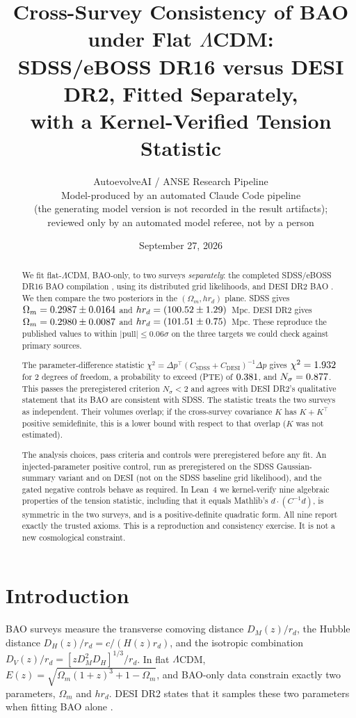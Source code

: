 \documentclass[11pt]{article}
\title{Cross-Survey Consistency of BAO under Flat $\Lambda$CDM:\\
SDSS/eBOSS DR16 versus DESI DR2, Fitted Separately,\\
with a Kernel-Verified Tension Statistic}
\author{AutoevolveAI / ANSE Research Pipeline \\
\small Model-produced by an automated Claude Code pipeline \\
\small (the generating model version is not recorded in the result artifacts); \\
\small reviewed only by an automated model referee, not by a person}
\date{September 27, 2026}
\begin{document}
\sloppy
\maketitle

\begin{abstract}
We fit flat-$\Lambda$CDM, BAO-only, to two surveys \emph{separately}: the
completed SDSS/eBOSS DR16 BAO compilation \cite{alam2021}, using its
distributed grid likelihoods, and DESI DR2 BAO \cite{desi2025dr2}. We then
compare the two posteriors in the $(\Omega_m, h r_d)$ plane. SDSS gives
$\Omega_m=0.2987\pm0.0164$ and $h r_d=(100.52\pm1.29)$~Mpc.
DESI DR2 gives $\Omega_m=0.2980\pm0.0087$ and
$h r_d=(101.51\pm0.75)$~Mpc. These reproduce the published values
to within $|\mathrm{pull}|\le0.06\sigma$ on the three targets we could check
against primary sources.

The parameter-difference statistic
$\chi^2=\Delta p^\top(C_\mathrm{SDSS}+C_\mathrm{DESI})^{-1}\Delta p$ gives
$\chi^2=1.932$ for 2 degrees of freedom, a probability to exceed
(PTE) of $0.381$, and $N_\sigma=0.877$. This passes the preregistered
criterion $N_\sigma<2$ and agrees with DESI DR2's qualitative statement
that its BAO are consistent with SDSS. The statistic treats the two surveys
as independent. Their volumes overlap; if the cross-survey covariance $K$
has $K+K^\top$ positive semidefinite, this is a lower bound with respect to
that overlap ($K$ was not estimated).

The analysis choices, pass criteria and controls were preregistered before
any fit. An injected-parameter positive control, run as preregistered on the
SDSS Gaussian-summary variant and on DESI (not on the SDSS baseline grid
likelihood), and the gated negative controls behave as required. In Lean~4 we kernel-verify nine algebraic properties of
the tension statistic, including that it equals Mathlib's
$d\cdot(C^{-1}d)$, is symmetric in the two surveys, and is a
positive-definite quadratic form. All nine report exactly the trusted axioms.
This is a reproduction and consistency exercise. It is not a new
cosmological constraint.
\end{abstract}

\section{Introduction}

BAO surveys measure the transverse comoving distance $D_M(z)/r_d$, the Hubble
distance $D_H(z)/r_d=c/(H(z)r_d)$, and the isotropic combination
$D_V(z)/r_d=[z D_M^2 D_H]^{1/3}/r_d$. In flat $\Lambda$CDM,
$E(z)=\sqrt{\Omega_m(1+z)^3+1-\Omega_m}$, and BAO-only data constrain exactly
two parameters, $\Omega_m$ and $h r_d$. DESI DR2 states that it samples
these two parameters when fitting BAO alone \cite{desi2025dr2}.
\end{document}
